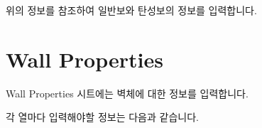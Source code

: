 \documentclass[a4paper,11pt,korean,openany,oneside]{sphinxmanual}
\begin{document}
\begin{sphinxShadowBox}

\sphinxAtStartPar
위의 정보를 참조하여 일반보와 탄성보의 정보를 입력합니다.
\end{sphinxShadowBox}

\sphinxstepscope


\section{Wall Properties}
\label{\detokenize{2_wall_properties:wall-properties}}\label{\detokenize{2_wall_properties::doc}}
\sphinxAtStartPar
Wall Properties 시트에는 벽체에 대한 정보를 입력합니다.

\sphinxAtStartPar
각 열마다 입력해야할 정보는 다음과 같습니다.
\end{document}
